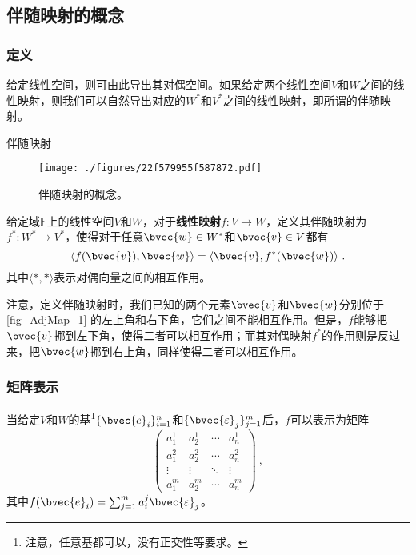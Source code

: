 


\subsection{伴随映射的概念}


\subsubsection{定义}

给定线性空间，则可由此导出其对偶空间。如果给定两个线性空间$V$和$W$之间的线性映射，则我们可以自然导出对应的$W^*$和$V^*$之间的线性映射，即所谓的伴随映射。



\begin{definition}{伴随映射}\label{def_AdjMap_1}

\begin{figure}[ht]
\centering
\texttt{[image: ./figures/22f579955f587872.pdf]}
\caption{伴随映射的概念。} \label{fig_AdjMap_1}
\end{figure}

给定域$\mathbb{F}$上的线性空间$V$和$W$，对于\textbf{线性映射}$f:V\to W$，定义其伴随映射为$f^*:W^*\to V^*$，使得对于任意$\bvec{w}\in W^*$和$\bvec{v}\in V$都有
\begin{equation}
\langle f(\bvec{v}), \bvec{w} \rangle = \langle \bvec{v}, f^*(\bvec{w}) \rangle~. 
\end{equation}
其中$\langle *, * \rangle$表示对偶向量之间的相互作用。
\end{definition}

注意，定义伴随映射时，我们已知的两个元素$\bvec{v}$和$\bvec{w}$分别位于\autoref{fig_AdjMap_1} 的左上角和右下角，它们之间不能相互作用。但是，$f$能够把$\bvec{v}$挪到左下角，使得二者可以相互作用；而其对偶映射$f^*$的作用则是反过来，把$\bvec{w}$挪到右上角，同样使得二者可以相互作用。



\subsubsection{矩阵表示}


当给定$V$和$W$的基\footnote{注意，任意基都可以，没有正交性等要求。}$\{\bvec{e}_i\}_{i=1}^n$和$\{\bvec{\varepsilon}_j\}_{j=1}^m$后，$f$可以表示为矩阵
\begin{equation}
\begin{pmatrix}
a^1_1&a^1_2&\cdots&a^1_n\\
a^2_1&a^2_2&\cdots&a^2_n\\
\vdots&\vdots&\ddots&\vdots\\
a^m_1&a^m_2&\cdots&a^m_n
\end{pmatrix}~, 
\end{equation}
其中$f(\bvec{e}_i)=\sum_{j=1}^m a^j_i\bvec{\varepsilon}_j$。

